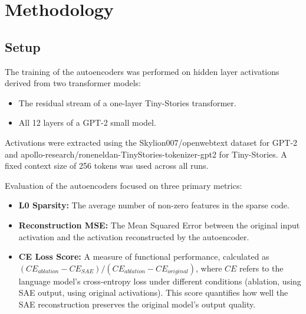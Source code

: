 \documentclass{article}
\begin{document}

\section{Methodology}
\label{sec:methodology}

\subsection{Setup}

The training of the autoencoders was performed on hidden layer activations derived from two transformer models:
\begin{itemize}
    \item The residual stream of a one-layer Tiny-Stories transformer.
    \item All 12 layers of a GPT-2 small model.
\end{itemize}
Activations were extracted using the Skylion007/openwebtext dataset for GPT-2 and apollo-research/roneneldan-TinyStories-tokenizer-gpt2 for Tiny-Stories. A fixed context size of 256 tokens was used across all runs.

Evaluation of the autoencoders focused on three primary metrics:
\begin{itemize}
    \item \textbf{L0 Sparsity:} The average number of non-zero features in the sparse code.
    \item \textbf{Reconstruction MSE:} The Mean Squared Error between the original input activation and the activation reconstructed by the autoencoder.
    \item \textbf{CE Loss Score:} A measure of functional performance, calculated as $(CE_{ablation} - CE_{SAE}) / (CE_{ablation} - CE_{original})$, where $CE$ refers to the language model's cross-entropy loss under different conditions (ablation, using SAE output, using original activations). This score quantifies how well the SAE reconstruction preserves the original model's output quality.
\end{itemize}
\end{document}
